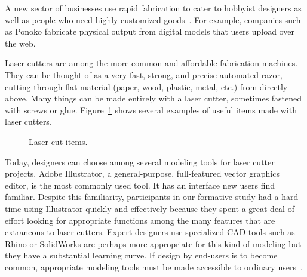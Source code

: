 \documentclass{article}
\begin{document}
A new sector of businesses use rapid fabrication to cater to hobbyist
designers as well as people who need highly customized
goods~\cite{nyt-rapidfab}.  For example, companies such as Ponoko
fabricate physical output from digital models that users upload over
the web.

Laser cutters are among the more common and affordable fabrication
machines. They can be thought of as a very fast, strong, and precise
automated razor, cutting through flat material (paper, wood, plastic,
metal, etc.) from directly above. Many things can be made entirely
with a laser cutter, sometimes fastened with screws or glue.
Figure~\ref{fig:laser-example} shows several examples of useful items
made with laser cutters.

\begin{figure}[h]
\centering 
{}
\caption{Laser cut items.}
\label{fig:laser-example}
\end{figure}

Today, designers can choose among several modeling tools for laser
cutter projects. Adobe Illustrator, a general-purpose, full-featured
vector graphics editor, is the most commonly used tool. It has an
interface new users find familiar. Despite this familiarity,
participants in our formative study had a hard time using Illustrator
quickly and effectively because they spent a great deal of effort
looking for appropriate functions among the many features that are
extraneous to laser cutters. Expert designers use specialized CAD
tools such as Rhino or SolidWorks are perhaps more appropriate for
this kind of modeling but they have a substantial learning curve. If
design by end-users is to become common, appropriate modeling tools
must be made accessible to ordinary users~\cite{lipson-homefactory}.
\end{document}
